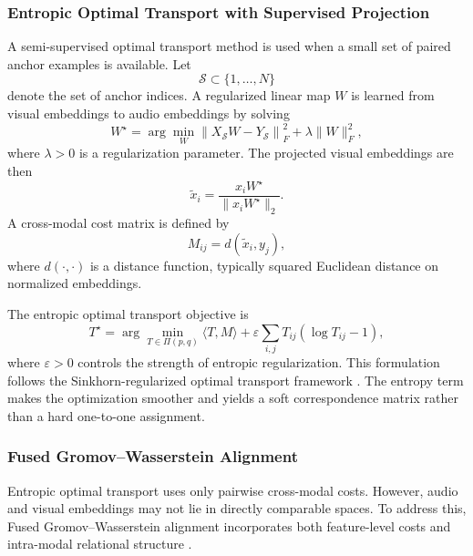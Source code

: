 \subsubsection{Entropic Optimal Transport with Supervised Projection}
\label{subsubsec:entropic_ot}

A semi-supervised optimal transport method is used when a small set of paired anchor examples is available. Let
\[
    \mathcal{S} \subset \{1,\ldots,N\}
\]
denote the set of anchor indices. A regularized linear map $W$ is learned from visual embeddings to audio embeddings by solving
\begin{equation}
    W^{\star}
    =
    \arg\min_{W}
    \left\|
    X_{\mathcal{S}} W - Y_{\mathcal{S}}
    \right\|_F^2
    +
    \lambda \|W\|_F^2,
\end{equation}
where $\lambda>0$ is a regularization parameter. The projected visual embeddings are then
\begin{equation}
    \tilde{x}_i =
    \frac{x_i W^{\star}}
    {\|x_i W^{\star}\|_2}.
\end{equation}
A cross-modal cost matrix is defined by
\begin{equation}
    M_{ij}
    =
    d(\tilde{x}_i, y_j),
\end{equation}
where $d(\cdot,\cdot)$ is a distance function, typically squared Euclidean distance on normalized embeddings.

The entropic optimal transport objective is
\begin{equation}
    T^{\star}
    =
    \arg\min_{T \in \Pi(p,q)}
    \langle T, M \rangle
    +
    \varepsilon
    \sum_{i,j}
    T_{ij}
    \left(
    \log T_{ij} - 1
    \right),
    \label{eq:entropic_ot}
\end{equation}
where $\varepsilon>0$ controls the strength of entropic regularization. This formulation follows the Sinkhorn-regularized optimal transport framework \cite{cuturi2013sinkhorn,peyre2019computational}. The entropy term makes the optimization smoother and yields a soft correspondence matrix rather than a hard one-to-one assignment.

\subsubsection{Fused Gromov--Wasserstein Alignment}
\label{subsubsec:fgw}

Entropic optimal transport uses only pairwise cross-modal costs. However, audio and visual embeddings may not lie in directly comparable spaces. To address this, Fused Gromov--Wasserstein alignment incorporates both feature-level costs and intra-modal relational structure \cite{vayer2020fused}.

